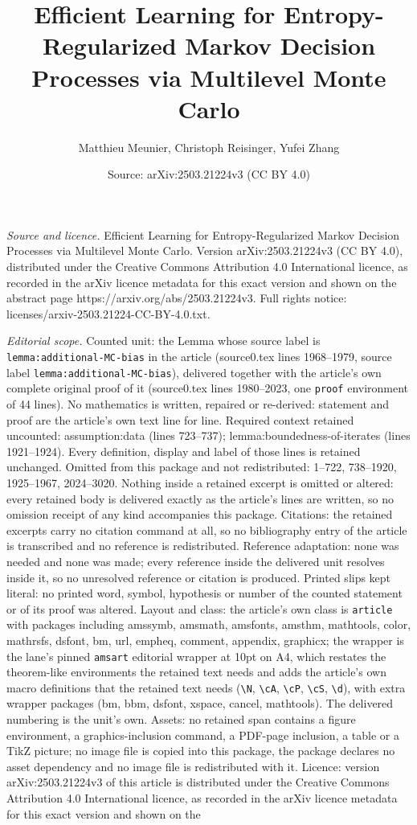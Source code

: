 \documentclass[10pt,a4paper]{amsart}
\title[Efficient Learning for Entropy-Regularized Markov Decision P]{Efficient Learning for Entropy-Regularized Markov Decision Processes via Multilevel Monte Carlo}
\author{Matthieu Meunier, Christoph Reisinger, Yufei Zhang}
\date{Source: arXiv:2503.21224v3 (CC BY 4.0)}
\begin{document}
\maketitle

\noindent\emph{Source and licence.} Efficient Learning for Entropy-Regularized Markov Decision Processes via Multilevel Monte Carlo. Version arXiv:2503.21224v3 (CC BY 4.0), distributed under the Creative Commons Attribution 4.0 International licence, as recorded in the arXiv licence metadata for this exact version and shown on the abstract page https://arxiv.org/abs/2503.21224v3. Full rights notice: licenses/arxiv-2503.21224-CC-BY-4.0.txt.\par\smallskip

\noindent\textit{Editorial scope.} Counted unit: the Lemma whose source label is \texttt{lemma:additional-MC-bias} in the article (source0.tex lines 1968--1979, source label \texttt{lemma:additional-MC-bias}), delivered together with the article's own complete original proof of it (source0.tex lines 1980--2023, one \texttt{proof} environment of 44 lines). No mathematics is written, repaired or re-derived: statement and proof are the article's own text line for line. Required context retained uncounted: assumption:data (lines 723--737); lemma:boundedness-of-iterates (lines 1921--1924). Every definition, display and label of those lines is retained unchanged. Omitted from this package and not redistributed: 1--722, 738--1920, 1925--1967, 2024--3020. Nothing inside a retained excerpt is omitted or altered: every retained body is delivered exactly as the article's lines are written, so no omission receipt of any kind accompanies this package. Citations: the retained excerpts carry no citation command at all, so no bibliography entry of the article is transcribed and no reference is redistributed. Reference adaptation: none was needed and none was made; every reference inside the delivered unit resolves inside it, so no unresolved reference or citation is produced. Printed slips kept literal: no printed word, symbol, hypothesis or number of the counted statement or of its proof was altered. Layout and class: the article's own class is \texttt{article} with packages including amssymb, amsmath, amsfonts, amsthm, mathtools, color, mathrsfs, dsfont, bm, url, empheq, comment, appendix, graphicx; the wrapper is the lane's pinned \texttt{amsart} editorial wrapper at 10pt on A4, which restates the theorem-like environments the retained text needs and adds the article's own macro definitions that the retained text needs (\texttt{\textbackslash N}, \texttt{\textbackslash cA}, \texttt{\textbackslash cP}, \texttt{\textbackslash cS}, \texttt{\textbackslash d}), with extra wrapper packages (bm, bbm, dsfont, xspace, cancel, mathtools). The delivered numbering is the unit's own. Assets: no retained span contains a figure environment, a graphics-inclusion command, a PDF-page inclusion, a table or a TikZ picture; no image file is copied into this package, the package declares no asset dependency and no image file is redistributed with it. Licence: version arXiv:2503.21224v3 of this article is distributed under the Creative Commons Attribution 4.0 International licence, as recorded in the arXiv licence metadata for this exact version and shown on the 
\end{document}
